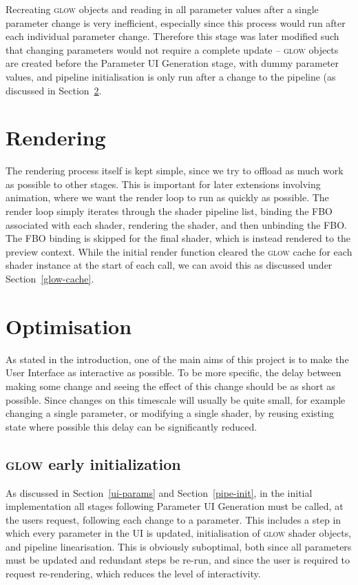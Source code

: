 \documentclass[12pt,twoside,notitlepage]{report}
\begin{document}
Recreating \textsc{glow} objects and reading in all parameter values after a single parameter change is very inefficient, especially since this process would run after each individual parameter change. Therefore this stage was later modified such that changing parameters would not require a complete update -- \textsc{glow} objects are created before the Parameter UI Generation stage, with dummy parameter values, and pipeline initialisation is only run after a change to the pipeline (as discussed in Section~\ref{opt}.

\section{Rendering}
The rendering process itself is kept simple, since we try to offload as much work as possible to other stages. This is important for later extensions involving animation, where we want the render loop to run as quickly as possible. The render loop simply iterates through the shader pipeline list, binding the FBO associated with each shader, rendering the shader, and then unbinding the FBO. The FBO binding is skipped for the final shader, which is instead rendered to the preview context. While the initial render function cleared the \textsc{glow} cache for each shader instance at the start of each call, we can avoid this as discussed under Section~\ref{glow-cache}.

\section{Optimisation}
\label{opt}
As stated in the introduction, one of the main aims of this project is to make the User Interface as interactive as possible. To be more specific, the delay between making some change and seeing the effect of this change should be as short as possible. Since changes on this timescale will usually be quite small, for example changing a single parameter, or modifying a single shader, by reusing existing state where possible this delay can be significantly reduced.

\subsection{\textsc{glow} early initialization}
As discussed in Section~\ref{ui-params} and Section~\ref{pipe-init}, in the initial implementation all stages following Parameter UI Generation must be called, at the users request, following each change to a parameter. This includes a step in which every parameter in the UI is updated, initialisation of \textsc{glow} shader objects, and pipeline linearisation. This is obviously suboptimal, both since all parameters must be updated and redundant steps be re-run, and since the user is required to request re-rendering, which reduces the level of interactivity.
\end{document}
